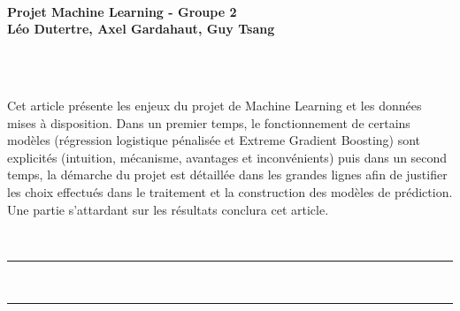 \documentclass[french]{article}
\makeatletter
\def\vhrulefill#1{\leavevmode\leaders\hrule\@height#1\hfill \kern\z@}
\renewenvironment{abstract} %
 {\par\noindent\textbf{\abstractname}\ \ignorespaces\\}
 {\par\medskip}
\makeatother
\begin{document}
\noindent\begin{minipage}{\textwidth}

\ \\[30pt]

{\LARGE \bf Projet Machine Learning - Groupe 2} \\

{\large \bf Léo Dutertre, 
            Axel Gardahaut, 
            Guy Tsang}



\end{minipage}

\



\null

\begin{abstract}
Cet article présente les enjeux du projet de Machine Learning et les données mises à disposition. Dans un premier temps, le fonctionnement de certains modèles (régression logistique pénalisée et Extreme Gradient Boosting) sont explicités (intuition, mécanisme, avantages et inconvénients) puis dans un second temps, la démarche du projet est détaillée dans les grandes lignes afin de justifier les choix effectués dans le traitement et la construction des modèles de prédiction. Une partie s'attardant sur les résultats conclura cet article.
\end{abstract}


\

\noindent \vhrulefill{1.5pt} ~ ~ \vhrulefill{1.5pt}
\end{document}
